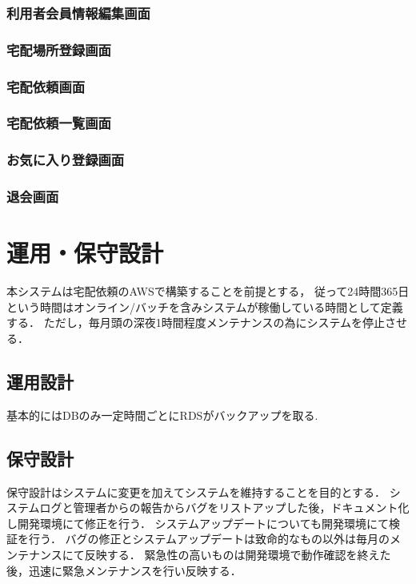 \documentclass[a4paper, titlepage]{jsarticle}
\begin{document}
\subsubsection{利用者会員情報編集画面}
\subsubsection{宅配場所登録画面}
\subsubsection{宅配依頼画面}
\subsubsection{宅配依頼一覧画面}
\subsubsection{お気に入り登録画面}
\subsubsection{退会画面}

\section{運用・保守設計}
本システムは宅配依頼のAWSで構築することを前提とする，
従って24時間365日という時間はオンライン/バッチを含みシステムが稼働している時間として定義する．
ただし，毎月頭の深夜1時間程度メンテナンスの為にシステムを停止させる．
\subsection{運用設計}
基本的にはDBのみ一定時間ごとにRDSがバックアップを取る.

\subsection{保守設計}
保守設計はシステムに変更を加えてシステムを維持することを目的とする．
システムログと管理者からの報告からバグをリストアップした後，ドキュメント化し開発環境にて修正を行う．
システムアップデートについても開発環境にて検証を行う．
バグの修正とシステムアップデートは致命的なもの以外は毎月のメンテナンスにて反映する．
緊急性の高いものは開発環境で動作確認を終えた後，迅速に緊急メンテナンスを行い反映する．
\end{document}

